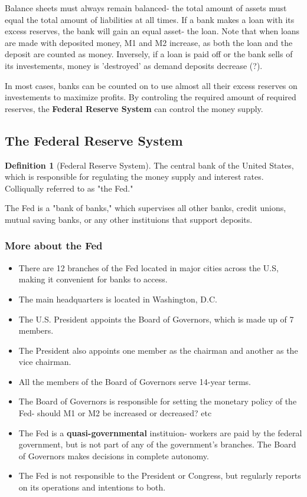 \documentclass[12pt, a4paper]{article}
\theoremstyle{definition}
\newtheorem{definition}{Definition}
\begin{document}
Balance sheets must always remain balanced- the total amount of assets must equal the total amount of liabilities at all times.
If a bank makes a loan with its excess reserves, the bank will gain an equal asset- the loan.
Note that when loans are made with deposited money, M1 and M2 increase, as both the loan and the deposit are counted as money.
Inversely, if a loan is paid off or the bank sells of its investements, money is 'destroyed' as demand deposits decrease (?).

In most cases, banks can be counted on to use almost all their excess reserves on investements to maximize profits.
By controling the required amount of required reserves, the \textbf{Federal Reserve System} can control the money supply.

\subsection{The Federal Reserve System}
\begin{definition}[Federal Reserve System]
    The central bank of the United States, which is responsible for regulating the money supply and interest rates.
    Colliqually referred to as "the Fed."
\end{definition}

The Fed is a "bank of banks," which supervises all other banks, credit unions, mutual saving banks, or any other instituions that support deposits.

\subsubsection{More about the Fed}
\begin{itemize}
    \item There are 12 branches of the Fed located in major cities across the U.S, making it convenient for banks to access.
    \item The main headquarters is located in Washington, D.C.
    \item The U.S. President appoints the Board of Governors, which is made up of 7 members.
    \item The President also appoints one member as the chairman and another as the vice chairman.
    \item All the members of the Board of Governors serve 14-year terms.
    \item The Board of Governors is responsible for setting the monetary policy of the Fed- should M1 or M2 be increased or decreased? etc
    \item The Fed is a \textbf{quasi-governmental} instituion- workers are paid by the federal government, but is not part of any of the government's branches. The Board of Governors makes decisions in complete autonomy.
    \item The Fed is not responsible to the President or Congress, but regularly reports on its operations and intentions to both.
\end{itemize}
\end{document}
